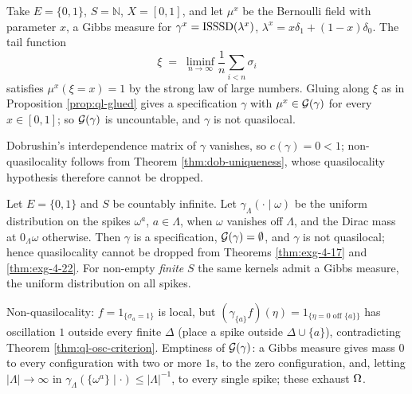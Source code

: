 \begin{example}
    \label{ex:ql-2-27}
    \leanok

    Take $E = \{0,1\}$, $S = \mathbb{N}$, $X = [0,1]$, and let $\mu^x$ be the Bernoulli field with
    parameter $x$, a Gibbs measure for $\gamma^x = \operatorname{ISSSD}(\lambda^x)$,
    $\lambda^x = x\delta_1 + (1-x)\delta_0$. The tail function
    \[\xi \;=\; \liminf_{n\to\infty} \frac{1}{n}\sum_{i < n} \sigma_i\]
    satisfies $\mu^x(\xi = x) = 1$ by the strong law of large numbers. Gluing along $\xi$ as in
    Proposition \ref{prop:ql-glued} gives a specification $\gamma$ with $\mu^x \in \mathcal{G}(\gamma)$
    for every $x \in [0,1]$; so $\mathcal{G}(\gamma)$ is uncountable, and $\gamma$ is not quasilocal.

    Dobrushin's interdependence matrix of $\gamma$ vanishes, so $c(\gamma) = 0 < 1$;
    non-quasilocality follows from Theorem \ref{thm:dob-uniqueness}, whose quasilocality
    hypothesis therefore cannot be dropped.
\end{example}

\begin{example}
    \label{ex:ql-4-16}
    \leanok

    Let $E = \{0,1\}$ and $S$ be countably infinite. Let $\gamma_\Lambda(\cdot \mid \omega)$ be the
    uniform distribution on the spikes $\omega^a$, $a \in \Lambda$, when $\omega$ vanishes off
    $\Lambda$, and the Dirac mass at $0_\Lambda\omega$ otherwise. Then $\gamma$ is a
    specification, $\mathcal{G}(\gamma) = \emptyset$, and $\gamma$ is not quasilocal; hence
    quasilocality cannot be dropped from Theorems \ref{thm:exg-4-17} and \ref{thm:exg-4-22}. For
    non-empty \emph{finite} $S$ the same kernels admit a Gibbs measure, the uniform distribution
    on all spikes.

    Non-quasilocality: $f = 1_{\{\sigma_a = 1\}}$ is local, but
    $(\gamma_{\{a\}} f)(\eta) = 1_{\{\eta = 0 \text{ off } \{a\}\}}$ has oscillation $1$ outside
    every finite $\Delta$ (place a spike outside $\Delta \cup \{a\}$), contradicting
    Theorem \ref{thm:ql-osc-criterion}. Emptiness of $\mathcal{G}(\gamma)$: a Gibbs measure gives mass
    $0$ to every configuration with two or more $1$s, to the zero configuration, and, letting
    $|\Lambda| \to \infty$ in $\gamma_\Lambda(\{\omega^a\} \mid \cdot) \le |\Lambda|^{-1}$, to
    every single spike; these exhaust $\Omega$.
\end{example}
